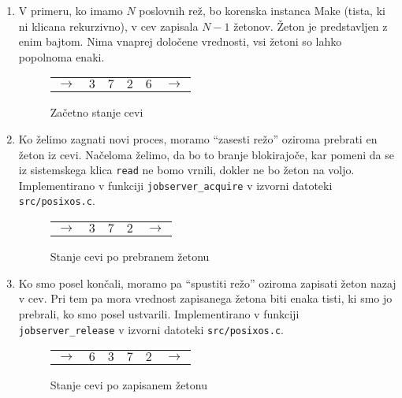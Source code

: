 \documentclass[notitlepage]{report}
\begin{document}
\begin{enumerate}
\item V primeru, ko imamo $N$ poslovnih rež, bo korenska instanca Make
  (tista, ki ni klicana rekurzivno), v cev zapisala $N - 1$
  žetonov. Žeton je predstavljen z enim bajtom. Nima vnaprej določene
  vrednosti, vsi žetoni so lahko popolnoma enaki.

  \begin{figure}[H]
    \begin{center}
      \begin{tabular}{ cc|c|c|cc }
        \cline{2-5}
        $\rightarrow$ & $3$ & $7$ & $2$ & $6$ & $\rightarrow$ \\
        \cline{2-5}
      \end{tabular}
      \end{center}
    \caption{Začetno stanje cevi}
  \end{figure}
\item Ko želimo zagnati novi proces, moramo ``zasesti režo'' oziroma
  prebrati en žeton iz cevi. Načeloma želimo, da bo to branje
  blokirajoče, kar pomeni da se iz sistemskega klica \verb|read| ne
  bomo vrnili, dokler ne bo žeton na voljo. Implementirano v funkciji
  \verb|jobserver_acquire| v izvorni datoteki \verb|src/posixos.c|.
  
  \begin{figure}[H]
    \begin{center}
      \begin{tabular}{ cc|c|cc }
        \cline{2-4}
        $\rightarrow$ & $3$ & $7$ & $2$ & $\rightarrow$ \\
        \cline{2-4}
      \end{tabular}
      \end{center}
    \caption{Stanje cevi po prebranem žetonu}
  \end{figure}

\item Ko smo posel končali, moramo pa ``spustiti režo'' oziroma
  zapisati žeton nazaj v cev. Pri tem pa mora vrednost zapisanega žetona biti
  enaka tisti, ki smo jo prebrali, ko smo posel ustvarili. Implementirano v funkciji
  \verb|jobserver_release| v izvorni datoteki \verb|src/posixos.c|.

    \begin{figure}[H]
    \begin{center}
      \begin{tabular}{ cc|c|c|cc }
        \cline{2-5}
        $\rightarrow$ & $6$ & $3$ & $7$ & $2$ & $\rightarrow$ \\
        \cline{2-5}
      \end{tabular}
      \end{center}
    \caption{Stanje cevi po zapisanem žetonu}
  \end{figure}
  
\end{enumerate}
\end{document}

